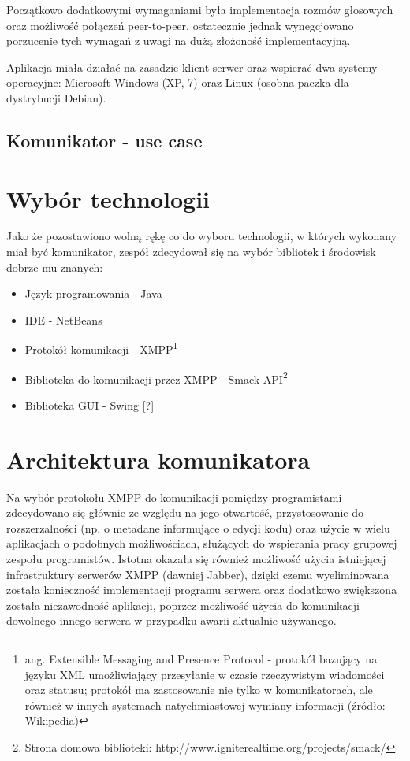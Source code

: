\documentclass[polish,11pt,a4paper,twoside]{article}
\begin{document}
Początkowo dodatkowymi wymaganiami była implementacja rozmów głosowych oraz możliwość połączeń peer-to-peer, ostatecznie jednak wynegcjowano porzucenie tych wymagań z uwagi na dużą złożoność implementacyjną.

Aplikacja miała działać na zasadzie klient-serwer oraz wspierać dwa systemy operacyjne: Microsoft Windows (XP, 7) oraz Linux (osobna paczka dla dystrybucji Debian).

\subsection{Komunikator - use case}

\section{Wybór technologii}

Jako że pozostawiono wolną rękę co do wyboru technologii, w których wykonany miał być komunikator, zespół zdecydował się na wybór bibliotek i środowisk dobrze mu znanych:
\begin{itemize}
\item Język programowania - Java
\item IDE - NetBeans
\item Protokół komunikacji - XMPP\footnote{ang. Extensible Messaging and Presence Protocol - protokół bazujący na języku XML umożliwiający przesyłanie w czasie rzeczywistym wiadomości oraz statusu; protokół ma zastosowanie nie tylko w komunikatorach, ale również w innych systemach natychmiastowej wymiany informacji (źródło: Wikipedia)}
\item Biblioteka do komunikacji przez XMPP - Smack API\footnote{Strona domowa biblioteki: http://www.igniterealtime.org/projects/smack/}
\item Biblioteka GUI - Swing [?]
\end{itemize}

\section{Architektura komunikatora}

Na wybór protokołu XMPP do komunikacji pomiędzy programistami zdecydowano się głównie ze względu na jego otwartość, przystosowanie do rozszerzalności (np. o metadane informujące o edycji kodu) oraz użycie w wielu aplikacjach o podobnych możliwościach, służących do wspierania pracy grupowej zespołu programistów. Istotna okazała się również możliwość użycia istniejącej infrastruktury serwerów XMPP (dawniej Jabber), dzięki czemu wyeliminowana została konieczność implementacji programu serwera oraz dodatkowo zwiększona została niezawodność aplikacji, poprzez możliwość użycia do komunikacji dowolnego innego serwera w przypadku awarii aktualnie używanego.
\end{document}
